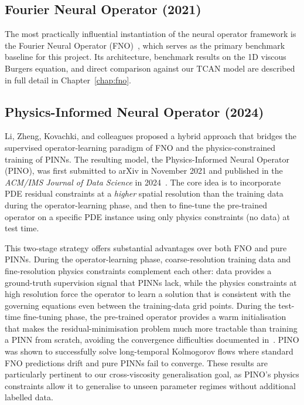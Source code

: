 \subsection{Fourier Neural Operator (2021)}
\label{sec:bg:fno}

The most practically influential instantiation of the neural operator framework is the Fourier Neural Operator (FNO)~\cite{li2021fourier}, which serves as the primary benchmark baseline for this project. Its architecture, benchmark results on the 1D viscous Burgers equation, and direct comparison against our TCAN model are described in full detail in Chapter~\ref{chap:fno}.

\subsection{Physics-Informed Neural Operator (2024)}
\label{sec:bg:pino}

Li, Zheng, Kovachki, and colleagues proposed a hybrid approach that bridges the supervised operator-learning paradigm of FNO and the physics-constrained training of PINNs. The resulting model, the Physics-Informed Neural Operator (PINO), was first submitted to arXiv in November 2021 and published in the \emph{ACM/IMS Journal of Data Science} in 2024~\cite{li2021pino}. The core idea is to incorporate PDE residual constraints at a \emph{higher} spatial resolution than the training data during the operator-learning phase, and then to fine-tune the pre-trained operator on a specific PDE instance using only physics constraints (no data) at test time.

This two-stage strategy offers substantial advantages over both FNO and pure PINNs. During the operator-learning phase, coarse-resolution training data and fine-resolution physics constraints complement each other: data provides a ground-truth supervision signal that PINNs lack, while the physics constraints at high resolution force the operator to learn a solution that is consistent with the governing equations even between the training-data grid points. During the test-time fine-tuning phase, the pre-trained operator provides a warm initialisation that makes the residual-minimisation problem much more tractable than training a PINN from scratch, avoiding the convergence difficulties documented in~\cite{raissi2019physics, rahaman2019spectral}. PINO was shown to successfully solve long-temporal Kolmogorov flows where standard FNO predictions drift and pure PINNs fail to converge. These results are particularly pertinent to our cross-viscosity generalisation goal, as PINO's physics constraints allow it to generalise to unseen parameter regimes without additional labelled data.

